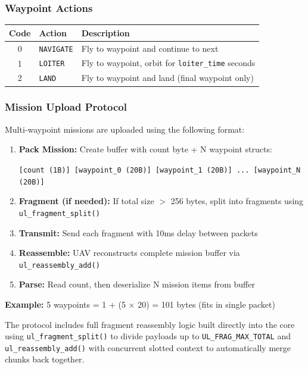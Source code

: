 \documentclass[11pt,a4paper]{article}
\begin{document}
\subsubsection{Waypoint Actions}

\begin{table}[H]
\centering
\begin{tabular}{@{}clp{8cm}@{}}
\toprule
\textbf{Code} & \textbf{Action} & \textbf{Description} \\
\midrule
0 & \texttt{NAVIGATE} & Fly to waypoint and continue to next \\
1 & \texttt{LOITER}   & Fly to waypoint, orbit for \texttt{loiter\_time} seconds \\
2 & \texttt{LAND}     & Fly to waypoint and land (final waypoint only) \\
\bottomrule
\end{tabular}
\end{table}

\subsubsection{Mission Upload Protocol}

Multi-waypoint missions are uploaded using the following format:

\begin{enumerate}[noitemsep]
    \item \textbf{Pack Mission:} Create buffer with count byte + N waypoint structs:
    \begin{center}
    \texttt{[count (1B)] [waypoint\_0 (20B)] [waypoint\_1 (20B)] ... [waypoint\_N (20B)]}
    \end{center}
    \item \textbf{Fragment (if needed):} If total size $>$ 256 bytes, split into fragments using \texttt{ul\_fragment\_split()}
    \item \textbf{Transmit:} Send each fragment with 10ms delay between packets
    \item \textbf{Reassemble:} UAV reconstructs complete mission buffer via \texttt{ul\_reassembly\_add()}
    \item \textbf{Parse:} Read count, then deserialize N mission items from buffer
\end{enumerate}

\textbf{Example:} 5 waypoints = 1 + (5 $\times$ 20) = 101 bytes (fits in single packet)

\begin{notebox}
The protocol includes full fragment reassembly logic built directly into the core using \texttt{ul\_fragment\_split()} to divide payloads up to \texttt{UL\_FRAG\_MAX\_TOTAL} and \texttt{ul\_reassembly\_add()} with concurrent slotted context to automatically merge chunks back together.
\end{notebox}
\end{document}
